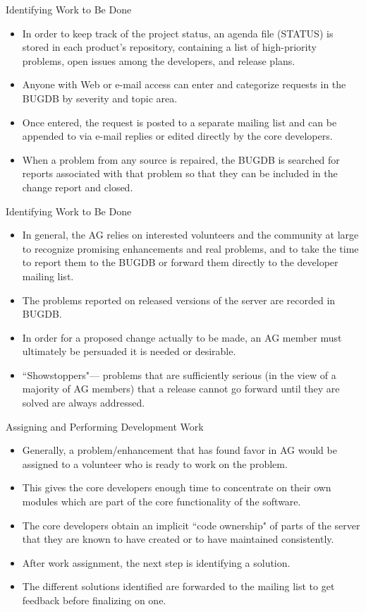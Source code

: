 \documentclass{beamer}
\begin{document}
\begin{frame}{Identifying Work to Be Done}
\begin{itemize}
	\item In order to keep track of the project status, an agenda file (STATUS) is stored in each product’s repository, containing a list of high-priority problems, open issues among the developers, and release plans.\pause
	\item Anyone with Web or e-mail access can enter and categorize requests in the BUGDB by severity and topic area.\pause
	\item Once entered, the request is posted to a separate mailing list and can be appended to via e-mail replies or edited directly by the core developers.\pause
	\item When a problem from any source is repaired, the BUGDB is searched for reports associated with that problem so that they can be included in the change report and closed.
\end{itemize}
\end{frame}

\begin{frame}{Identifying Work to Be Done}
\begin{itemize}
	\item In general, the AG relies on interested volunteers and the community at large to recognize promising enhancements and real problems, and to take the time to report them to the BUGDB or forward them directly to the developer mailing list.\pause
	\item The problems reported on released versions of the server are
recorded in BUGDB.\pause
	\item In order for a proposed change actually to be made, an AG member must ultimately be persuaded it is needed or desirable.\pause
	\item ``Showstoppers"— problems that are sufficiently serious (in the view of a majority of AG members) that a release cannot go forward until they are solved are always addressed. 
\end{itemize}
\end{frame}

\begin{frame}{Assigning and Performing Development Work}
\begin{itemize}
	\item Generally, a problem/enhancement that has found favor in AG would be assigned to a volunteer who is ready to work on the problem. \pause
	\item This gives the core developers enough time to concentrate on their own modules which are part of the core functionality of the software. \pause
	\item The core developers obtain an implicit ``code ownership" of parts of the server that they are known to have created or to have maintained consistently. \pause
	\item After work assignment, the next step is identifying a solution. \pause
	\item The different solutions identified are forwarded to the mailing list to get feedback before finalizing on one.
\end{itemize}
\end{frame}
\end{document}
